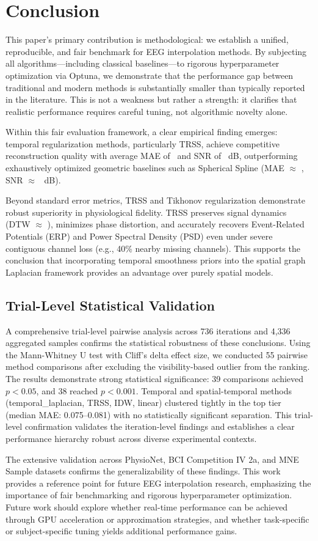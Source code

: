 \section{Conclusion}

This paper's primary contribution is methodological: we establish a unified, reproducible, and fair benchmark for EEG interpolation methods. By subjecting all algorithms—including classical baselines—to rigorous hyperparameter optimization via Optuna, we demonstrate that the performance gap between traditional and modern methods is substantially smaller than typically reported in the literature. This is not a weakness but rather a strength: it clarifies that realistic performance requires careful tuning, not algorithmic novelty alone.

Within this fair evaluation framework, a clear empirical finding emerges: temporal regularization methods, particularly TRSS, achieve competitive reconstruction quality with average MAE of \ResTVMAE\ and SNR of \ResTVSNR~dB, outperforming exhaustively optimized geometric baselines such as Spherical Spline (MAE $\approx$ \ResBaselineMAE, SNR $\approx$ \ResBaselineSNR~dB).

Beyond standard error metrics, TRSS and Tikhonov regularization demonstrate robust superiority in physiological fidelity. TRSS preserves signal dynamics (DTW $\approx$ \ResTVDTW), minimizes phase distortion, and accurately recovers Event-Related Potentials (ERP) and Power Spectral Density (PSD) even under severe contiguous channel loss (e.g., 40\% nearby missing channels). This supports the conclusion that incorporating temporal smoothness priors into the spatial graph Laplacian framework provides an advantage over purely spatial models.

\subsection*{Trial-Level Statistical Validation}
A comprehensive trial-level pairwise analysis across 736 iterations and 4,336 aggregated samples confirms the statistical robustness of these conclusions. Using the Mann-Whitney U test with Cliff's delta effect size, we conducted 55 pairwise method comparisons after excluding the visibility-based outlier from the ranking. The results demonstrate strong statistical significance: 39 comparisons achieved $p < 0.05$, and 38 reached $p < 0.001$. Temporal and spatial-temporal methods (temporal\_laplacian, TRSS, IDW, linear) clustered tightly in the top tier (median MAE: 0.075--0.081) with no statistically significant separation. This trial-level confirmation validates the iteration-level findings and establishes a clear performance hierarchy robust across diverse experimental contexts.

The extensive validation across PhysioNet, BCI Competition IV 2a, and MNE Sample datasets confirms the generalizability of these findings. This work provides a reference point for future EEG interpolation research, emphasizing the importance of fair benchmarking and rigorous hyperparameter optimization. Future work should explore whether real-time performance can be achieved through GPU acceleration or approximation strategies, and whether task-specific or subject-specific tuning yields additional performance gains.
